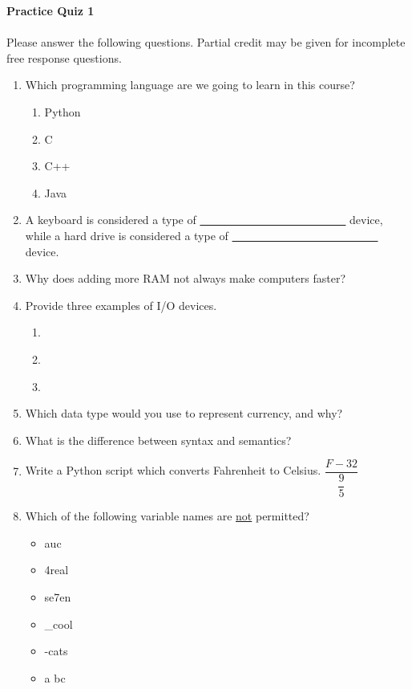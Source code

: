\documentclass[letter,10pt]{article}
\begin{document}
\huge
\textbf{Practice Quiz 1}
\normalsize

\paragraph{}Please answer the following questions. Partial credit may be given for incomplete free response questions.

\begin{enumerate}
    \item Which programming language are we going to learn in this course?
    \begin{enumerate}
        \item Python
        \item C
        \item C++
        \item Java
    \end{enumerate}
    
    \item A keyboard is considered a type of \underline{~~ ~~ ~~ ~~ ~~ ~~ ~~ ~~ ~~ ~~} device, while a hard drive is considered a type of \underline{~~ ~~ ~~ ~~ ~~ ~~ ~~ ~~ ~~ ~~} device.
    
    \item Why does adding more RAM not always make computers faster?
    
    \item Provide three examples of I/O devices.
    \begin{enumerate}
        \item ~~ ~~
        \item ~~ ~~
        \item ~~ ~~
    \end{enumerate}
    
    \item Which data type would you use to represent currency, and why?
    
    \item What is the difference between syntax and semantics?
    
    \item Write a Python script which converts Fahrenheit to Celsius. $\dfrac{F - 32}{\dfrac{9}{5}}$
    
    \item Which of the following variable names are \underline{not} permitted?
    \begin{itemize}
        \item auc
        \item 4real
        \item se7en
        \item \_cool
        \item -cats
        \item a bc
    \end{itemize}


\end{enumerate}
\end{document}
